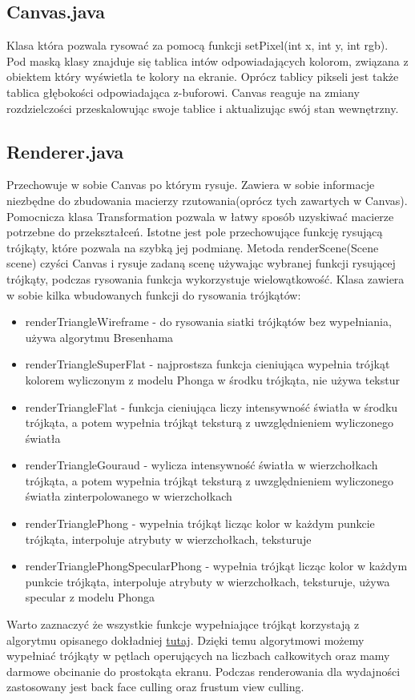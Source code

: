 \documentclass[onecolumn]{article}
\begin{document}
\subsection{Canvas.java}
Klasa która pozwala rysować za pomocą funkcji setPixel(int x, int y, int rgb). Pod maską klasy znajduje się tablica intów odpowiadających kolorom, związana z obiektem który wyświetla te kolory na ekranie. Oprócz tablicy pikseli jest także tablica głębokości odpowiadająca z-buforowi. Canvas reaguje na zmiany rozdzielczości przeskalowując swoje tablice i aktualizując swój stan wewnętrzny.

\subsection{Renderer.java}
Przechowuje w sobie Canvas po którym rysuje. Zawiera w sobie informacje niezbędne do zbudowania macierzy rzutowania(oprócz tych zawartych w Canvas). Pomocnicza klasa Transformation pozwala w łatwy sposób uzyskiwać macierze potrzebne do przekształceń. Istotne jest pole przechowujące funkcję rysującą trójkąty, które pozwala na szybką jej podmianę. Metoda renderScene(Scene scene) czyści Canvas i rysuje zadaną scenę używając wybranej funkcji rysującej trójkąty, podczas rysowania funkcja wykorzystuje wielowątkowość. Klasa zawiera w sobie kilka wbudowanych funkcji do rysowania trójkątów:
\begin{itemize}
	\item renderTriangleWireframe - do rysowania siatki trójkątów bez wypełniania, używa algorytmu Bresenhama
	\item renderTriangleSuperFlat - najprostsza funkcja cieniująca wypełnia trójkąt kolorem wyliczonym z modelu Phonga w środku trójkąta, nie używa tekstur
	\item renderTriangleFlat - funkcja cieniująca liczy intensywność światła w środku trójkąta, a potem wypełnia trójkąt teksturą z uwzględnieniem wyliczonego światła
	\item renderTriangleGouraud - wylicza intensywność światła w wierzchołkach trójkąta, a potem wypełnia trójkąt teksturą z uwzględnieniem wyliczonego światła zinterpolowanego w wierzchołkach
	\item renderTrianglePhong - wypełnia trójkąt licząc kolor w każdym punkcie trójkąta, interpoluje atrybuty w wierzchołkach, teksturuje
	\item renderTrianglePhongSpecularPhong - wypełnia trójkąt licząc kolor w każdym punkcie trójkąta, interpoluje atrybuty w wierzchołkach, teksturuje, używa specular z modelu Phonga
\end{itemize}
Warto zaznaczyć że wszystkie funkcje wypełniające trójkąt korzystają z algorytmu opisanego dokładniej \href{https://fgiesen.wordpress.com/2013/02/08/triangle-rasterization-in-practice/}{tutaj}. Dzięki temu algorytmowi możemy wypełniać trójkąty w pętlach operujących na liczbach całkowitych oraz mamy darmowe obcinanie do prostokąta ekranu. Podczas renderowania dla wydajności zastosowany jest back face culling oraz frustum view culling.
\end{document}

